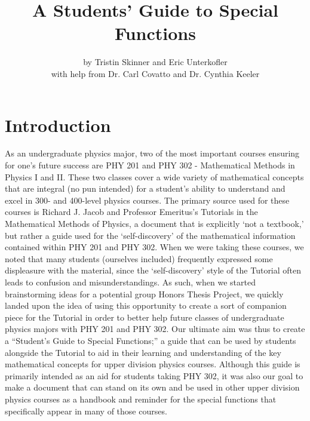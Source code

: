 \documentclass[11pt]{report}
\title{\textbf{A Students' Guide to Special Functions}}
\author{by Tristin Skinner and Eric Unterkofler \\ with help from Dr. Carl Covatto and Dr. Cynthia Keeler}
\date{}
\begin{document}
\maketitle










\chapter*{Introduction}



As an undergraduate physics major, two of the most important courses ensuring for one’s future success are PHY 201 and PHY 302 - Mathematical Methods in Physics I and II. These two classes cover a wide variety of mathematical concepts that are integral (no pun intended) for a student’s ability to understand and excel in 300- and 400-level physics courses. The primary source used for these courses is Richard J. Jacob and Professor Emeritus’s Tutorials in the Mathematical Methods of Physics, a document that is explicitly `not a textbook,’ but rather a guide used for the `self-discovery’ of the mathematical information contained within PHY 201 and PHY 302. When we were taking these courses, we noted that many students (ourselves included) frequently expressed some displeasure with the material, since the ‘self-discovery’ style of the Tutorial often leads to confusion and misunderstandings. As such, when we started brainstorming ideas for a potential group Honors Thesis Project, we quickly landed upon the idea of using this opportunity to create a sort of companion piece for the Tutorial in order to better help future classes of undergraduate physics majors with PHY 201 and PHY 302. Our ultimate aim was thus to create a ``Student’s Guide to Special Functions;'' a guide that can be used by students alongside the Tutorial to aid in their learning and understanding of the key mathematical concepts for upper division physics courses. Although this guide is primarily intended as an aid for students taking PHY 302, it was also our goal to make a document that can stand on its own and be used in other upper division physics courses as a handbook and reminder for the special functions that specifically appear in many of those courses.\\
\end{document}
